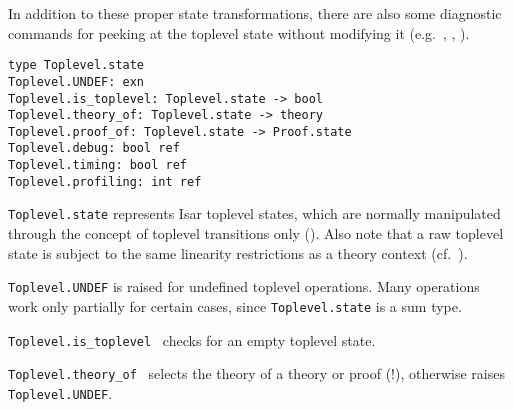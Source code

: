 \begin{isabellebody}
\begin{isamarkuptext}
  In addition to these proper state transformations, there are also
  some diagnostic commands for peeking at the toplevel state without
  modifying it (e.g.\ , ,
  ).%
\end{isamarkuptext}%
\isamarkuptrue%
%
\isadelimmlref
%
\endisadelimmlref
%
\isatagmlref
%
\begin{isamarkuptext}%
\begin{mldecls}
  \verb|type Toplevel.state| \\
  \verb|Toplevel.UNDEF: exn| \\
  \verb|Toplevel.is_toplevel: Toplevel.state -> bool| \\
  \verb|Toplevel.theory_of: Toplevel.state -> theory| \\
  \verb|Toplevel.proof_of: Toplevel.state -> Proof.state| \\
  \verb|Toplevel.debug: bool ref| \\
  \verb|Toplevel.timing: bool ref| \\
  \verb|Toplevel.profiling: int ref| \\
  \end{mldecls}

  \begin{description}

  \item \verb|Toplevel.state| represents Isar toplevel states,
  which are normally manipulated through the concept of toplevel
  transitions only ().  Also note that
  a raw toplevel state is subject to the same linearity restrictions
  as a theory context (cf.~).

  \item \verb|Toplevel.UNDEF| is raised for undefined toplevel
  operations.  Many operations work only partially for certain cases,
  since \verb|Toplevel.state| is a sum type.

  \item \verb|Toplevel.is_toplevel|~ checks for an empty
  toplevel state.

  \item \verb|Toplevel.theory_of|~ selects the theory of
  a theory or proof (!), otherwise raises \verb|Toplevel.UNDEF|.


\end{description}
\end{isamarkuptext}
\end{isabellebody}
